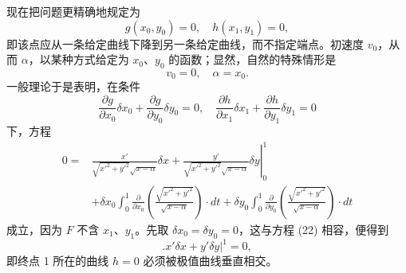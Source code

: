 \documentclass[11pt,a4paper,leqno]{article}
\begin{document}
现在把问题更精确地规定为
\[
g(x_0,y_0)=0,\quad h(x_1,y_1)=0,
\]
即该点应从一条给定曲线下降到另一条给定曲线，而不指定端点。初速度 $v_0$，从而 $\alpha$，以某种方式给定为 $x_0$、$y_0$ 的函数；显然，自然的特殊情形是
\begin{equation}\tag{21}
v_0=0,\quad \alpha=x_0.
\end{equation}
一般理论于是表明，在条件
\begin{equation}\tag{22}
\frac{\partial g}{\partial x_0}\delta x_0+\frac{\partial g}{\partial y_0}\delta y_0=0,
\quad
\frac{\partial h}{\partial x_1}\delta x_1+\frac{\partial h}{\partial y_1}\delta y_1=0
\end{equation}
下，方程
\begin{equation}\tag{23}
\begin{split}
0={}&\left.\frac{x'}{\sqrt{x'^2+y'^2}\sqrt{x-\alpha}}\delta x+\frac{y'}{\sqrt{x'^2+y'^2}\sqrt{x-\alpha}}\delta y\right|_0^1\\
&+\delta x_0\int_0^1\frac{\partial}{\partial x_0}\left(\frac{\sqrt{x'^2+y'^2}}{\sqrt{x-\alpha}}\right)\cdot dt
+\delta y_0\int_0^1\frac{\partial}{\partial y_0}\left(\frac{\sqrt{x'^2+y'^2}}{\sqrt{x-\alpha}}\right)\cdot dt
\end{split}
\end{equation}
成立，因为 $F$ 不含 $x_1$、$y_1$。先取 $\delta x_0=\delta y_0=0$，这与方程 (22) 相容，便得到
\[
\bigl. x'\delta x+y'\delta y\bigr|^1=0,
\]
即终点 1 所在的曲线 $h=0$ 必须被极值曲线垂直相交。
\end{document}
